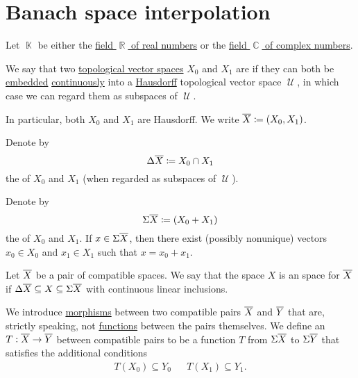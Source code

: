 \section{Banach space interpolation}\label{sec:banach_space_interpolation}

\begin{definition}\label{def:interpolated_topological_vector_space}
  Let \( \BbbK \) be either the \hyperref[def:real_numbers]{field \( \BbbR \) of real numbers} or the \hyperref[def:real_numbers]{field \( \BbbC \) of complex numbers}.

  \begin{thmenum}
     We say that two \hyperref[def:topological_vector_space]{topological vector spaces} \( X_0 \) and \( X_1 \) are  if they can both be \hyperref[def:morphism_invertibility/left_cancellative]{embedded} \hyperref[def:global_continuity]{continuously} into a \hyperref[def:separation_axioms/T2]{Hausdorff} topological vector space \( \mscrU \), in which case we can regard them as subspaces of \( \mscrU \).

    In particular, both \( X_0 \) and \( X_1 \) are Hausdorff. We write \( \oline{X} \coloneqq (X_0, X_1) \).

     Denote by
    \begin{equation*}
      \Delta \oline{X} \coloneqq X_0 \cap X_1
    \end{equation*}
    the  of \( X_0 \) and \( X_1 \) (when regarded as subspaces of \( \mscrU \)).

     Denote by
    \begin{equation*}
      \Sigma \oline{X} \coloneqq ( X_0 + X_1 )
    \end{equation*}
    the  of \( X_0 \) and \( X_1 \). If \( x \in \Sigma \oline{X} \), then there exist (possibly nonunique) vectors \( x_0 \in X_0 \) and \( x_1 \in X_1 \) such that \( x = x_0 + x_1 \).

     Let \( \oline{X} \) be a pair of compatible spaces. We say that the space \( X \) is an  space for \( \oline{X} \) if \( \Delta \oline{X} \subseteq X \subseteq \Sigma \oline{X} \) with continuous linear inclusions.

     We introduce \hyperref[def:category/morphisms]{morphisms} between two compatible pairs \( \oline{X} \) and \( \oline{Y} \) that are, strictly speaking, not \hyperref[def:function]{functions} between the pairs themselves. We define an  \( T: \oline{X} \to \oline{Y} \) between compatible pairs to be a function \( T \) from \( \Sigma \oline{X} \) to \( \Sigma \oline{Y} \) that satisfies the additional conditions
    \begin{align*}
      T(X_0) \subseteq Y_0
      &&
      T(X_1) \subseteq Y_1.
    \end{align*}


\end{thmenum}
\end{definition}
